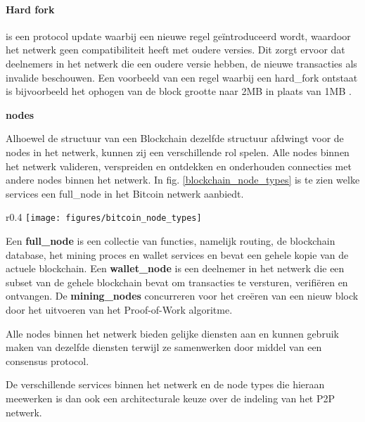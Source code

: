 \paragraph{Hard fork}

is een protocol update waarbij een nieuwe regel geïntroduceerd wordt, waardoor het netwerk geen compatibiliteit heeft met oudere versies. Dit zorgt ervoor dat deelnemers in het netwerk die een oudere versie hebben, de nieuwe transacties als invalide beschouwen. Een voorbeeld van een regel waarbij een \gls{hard_fork} ontstaat is bijvoorbeeld het ophogen van de block grootte naar 2MB in plaats van 1MB \citep[Hard Fork]{coindesk:forks}. 

\newpage
\textbf{\Glspl{node}}

Alhoewel de structuur van een Blockchain dezelfde structuur afdwingt voor de \glspl{node} in het netwerk, kunnen zij een verschillende rol spelen. Alle \glspl{node} binnen het netwerk valideren, verspreiden en ontdekken en onderhouden connecties met andere \glspl{node} binnen het netwerk. In fig. \ref{blockchain_node_types} is te zien welke services een  \gls{full_node} in het Bitcoin netwerk aanbiedt. 

\begin{wrapfigure}{r}{0.4\textwidth}
  \texttt{[image: figures/bitcoin\_node\_types]}
  \caption{Een bitcoin netwerk node die alle functies bevat: wallet, mining, blockchain database en netwerk routing, \citep[p.~172]{Antonopoulos:2014:MBU:2695500}.}
  \label{blockchain_node_types}
\end{wrapfigure}

Een \textbf{\gls{full_node}} is een collectie van functies, namelijk routing, de blockchain database, het mining proces en wallet services en bevat een gehele kopie van de actuele blockchain. Een \textbf{\gls{wallet_node}} is een deelnemer in het netwerk die een subset van de gehele blockchain bevat om transacties te versturen, verifiëren en ontvangen. De \textbf{\glspl{mining_node}} concurreren voor het creëren van een nieuw block door het uitvoeren van het Proof-of-Work algoritme. 

Alle \glspl{node} binnen het netwerk bieden gelijke diensten aan en kunnen gebruik maken van dezelfde diensten terwijl ze samenwerken door middel van een consensus protocol.

De verschillende services binnen het netwerk en de \gls{node} types die hieraan meewerken is dan ook een architecturale keuze over de indeling van het \acrshort{P2P} netwerk.
